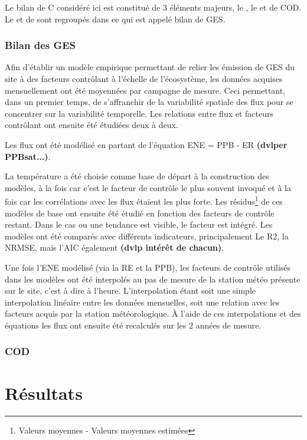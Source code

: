 Le bilan de C considéré ici est constitué de 3 éléments majeurs, le \coo, le \chh et de COD.
Le \coo et de \chh sont regroupés dans ce qui est appelé bilan de GES.

\subsubsection{Bilan des GES}

Afin d'établir un modèle empirique permettant de relier les émission de GES du site à des facteurs contrôlant à l'échelle de l'écosystème, les données acquises mensuellement ont été moyennées par campagne de mesure.
Ceci permettant, dans un premier temps, de s'affranchir de la variabilité spatiale des flux pour se concentrer sur la variabilité temporelle.
Les relations entre flux et facteurs contrôlant ont ensuite été étudiées deux à deux.

Les flux ont été modélisé en partant de l'équation ENE = PPB - ER \textbf{(dvlper PPBsat...)}.

La température a été choisie comme base de départ à la construction des modèles, à la fois car c'est le facteur de contrôle le plus souvent invoqué et à la fois car les corrélations avec les flux étaient les plus forte.
Les résidus\footnote{Valeurs moyennes - Valeurs moyennes estimées} de ces modèles de base ont ensuite été étudié en fonction des facteurs de contrôle restant.
Dans le cas ou une tendance est visible, le facteur est intégré.
Les modèles ont été comparés avec différents indicateurs, principalement Le R2, la NRMSE, mais l'AIC également \textbf{(dvlp intérêt de chacun)}.

Une fois l'ENE modélisé (via la RE et la PPB), les facteurs de contrôle utilisés dans les modèles ont été interpolés au pas de mesure de la station météo présente sur le site, c'est à dire à l'heure.
L'interpolation étant soit une simple interpolation linéaire entre les données mensuelles, soit une relation avec les facteurs acquis par la station météorologique.
À l'aide de ces interpolations et des équations les flux ont ensuite été recalculés sur les 2 années de mesure.


\subsubsection{COD}

\section{Résultats}

